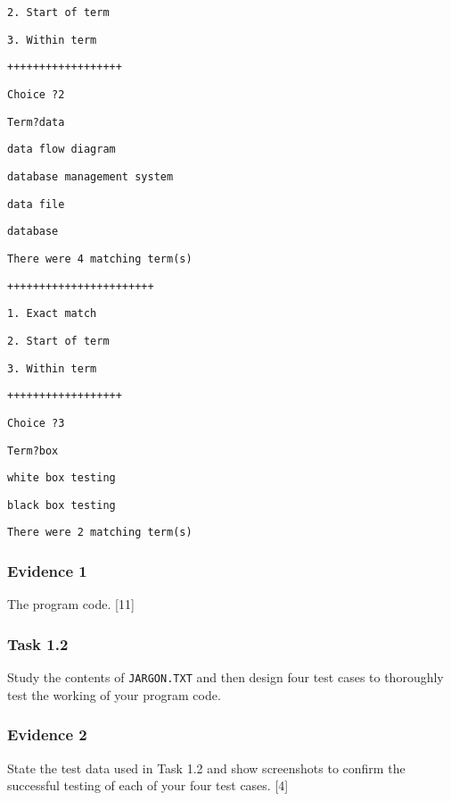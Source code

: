 \texttt{2. Start of term }

\texttt{3. Within term }

\texttt{++++++++++++++++++ }

\texttt{Choice ?2 }

\texttt{Term?data }

\texttt{data flow diagram }

\texttt{database management system }

\texttt{data file }

\texttt{database }

\texttt{There were 4 matching term(s)}

\texttt{+++++++++++++++++++++++ }

\texttt{1. Exact match }

\texttt{2. Start of term }

\texttt{3. Within term }

\texttt{++++++++++++++++++}

\texttt{Choice ?3 }

\texttt{Term?box }

\texttt{white box testing }

\texttt{black box testing }

\texttt{There were 2 matching term(s)}

\subsubsection*{Evidence 1}

The program code. \hfill{}{[}11{]}

\subsubsection*{Task 1.2}

Study the contents of \texttt{JARGON.TXT} and then design four test
cases to thoroughly test the working of your program code.

\subsubsection*{Evidence 2}

State the test data used in Task 1.2 and show screenshots to confirm
the successful testing of each of your four test cases. \hfill{}{[}4{]}